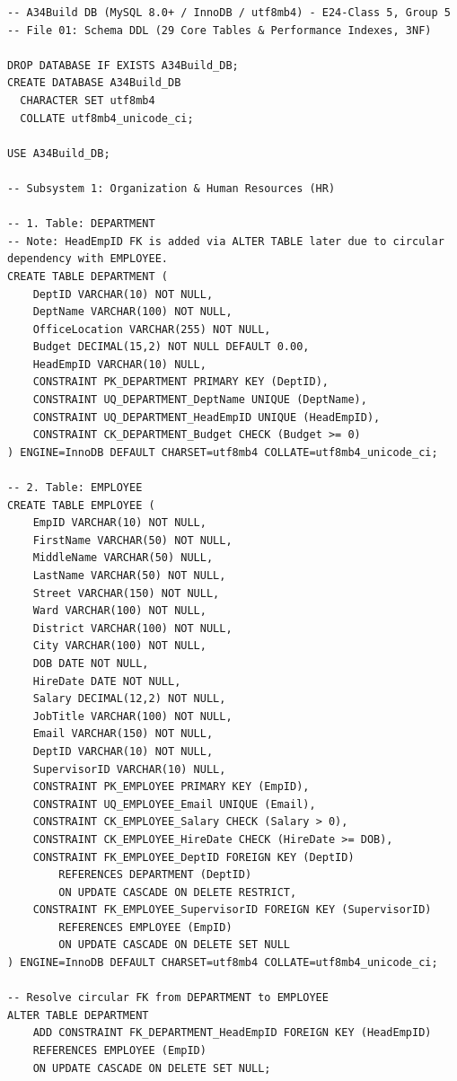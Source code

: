 \documentclass[a4paper,12pt]{report}
\begin{document}
\begin{lstlisting}
-- A34Build DB (MySQL 8.0+ / InnoDB / utf8mb4) - E24-Class 5, Group 5
-- File 01: Schema DDL (29 Core Tables & Performance Indexes, 3NF)

DROP DATABASE IF EXISTS A34Build_DB;
CREATE DATABASE A34Build_DB
  CHARACTER SET utf8mb4
  COLLATE utf8mb4_unicode_ci;

USE A34Build_DB;

-- Subsystem 1: Organization & Human Resources (HR)

-- 1. Table: DEPARTMENT
-- Note: HeadEmpID FK is added via ALTER TABLE later due to circular dependency with EMPLOYEE.
CREATE TABLE DEPARTMENT (
    DeptID VARCHAR(10) NOT NULL,
    DeptName VARCHAR(100) NOT NULL,
    OfficeLocation VARCHAR(255) NOT NULL,
    Budget DECIMAL(15,2) NOT NULL DEFAULT 0.00,
    HeadEmpID VARCHAR(10) NULL,
    CONSTRAINT PK_DEPARTMENT PRIMARY KEY (DeptID),
    CONSTRAINT UQ_DEPARTMENT_DeptName UNIQUE (DeptName),
    CONSTRAINT UQ_DEPARTMENT_HeadEmpID UNIQUE (HeadEmpID),
    CONSTRAINT CK_DEPARTMENT_Budget CHECK (Budget >= 0)
) ENGINE=InnoDB DEFAULT CHARSET=utf8mb4 COLLATE=utf8mb4_unicode_ci;

-- 2. Table: EMPLOYEE
CREATE TABLE EMPLOYEE (
    EmpID VARCHAR(10) NOT NULL,
    FirstName VARCHAR(50) NOT NULL,
    MiddleName VARCHAR(50) NULL,
    LastName VARCHAR(50) NOT NULL,
    Street VARCHAR(150) NOT NULL,
    Ward VARCHAR(100) NOT NULL,
    District VARCHAR(100) NOT NULL,
    City VARCHAR(100) NOT NULL,
    DOB DATE NOT NULL,
    HireDate DATE NOT NULL,
    Salary DECIMAL(12,2) NOT NULL,
    JobTitle VARCHAR(100) NOT NULL,
    Email VARCHAR(150) NOT NULL,
    DeptID VARCHAR(10) NOT NULL,
    SupervisorID VARCHAR(10) NULL,
    CONSTRAINT PK_EMPLOYEE PRIMARY KEY (EmpID),
    CONSTRAINT UQ_EMPLOYEE_Email UNIQUE (Email),
    CONSTRAINT CK_EMPLOYEE_Salary CHECK (Salary > 0),
    CONSTRAINT CK_EMPLOYEE_HireDate CHECK (HireDate >= DOB),
    CONSTRAINT FK_EMPLOYEE_DeptID FOREIGN KEY (DeptID) 
        REFERENCES DEPARTMENT (DeptID) 
        ON UPDATE CASCADE ON DELETE RESTRICT,
    CONSTRAINT FK_EMPLOYEE_SupervisorID FOREIGN KEY (SupervisorID) 
        REFERENCES EMPLOYEE (EmpID) 
        ON UPDATE CASCADE ON DELETE SET NULL
) ENGINE=InnoDB DEFAULT CHARSET=utf8mb4 COLLATE=utf8mb4_unicode_ci;

-- Resolve circular FK from DEPARTMENT to EMPLOYEE
ALTER TABLE DEPARTMENT
    ADD CONSTRAINT FK_DEPARTMENT_HeadEmpID FOREIGN KEY (HeadEmpID)
    REFERENCES EMPLOYEE (EmpID)
    ON UPDATE CASCADE ON DELETE SET NULL;


\end{lstlisting}
\end{document}
